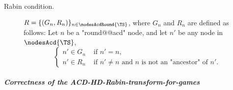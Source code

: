 \documentclass[10pt,a4paper]{amsart}
\begin{document}
\begin{definition}
\begin{description}
 		\item[Rabin condition.] $R = \{(G_n, R_n)\}_{n\in \nodesAcdRound{\TS}}$, where $G_n$ and $R_n$ are defined as follows: Let $n$ be a "round@@acd" node, and let $n'$ be any node in $\nodesAcd{\TS}$,
 		\begin{equation*}
 			\begin{cases}
 				n' \in G_n & \text{ if } n'=n,\\
 				n' \in R_n & \text{ if }  n'\neq n \text{ and } n \text{ is not an "ancestor" of } n'. 
 			\end{cases}
 		\end{equation*} 	
 	
 	\end{description}
 \end{definition}


\subparagraph*{Correctness of the ACD-HD-Rabin-transform-for-games}
\correctnessAcdRabinTransformGames*
 
\end{document}
